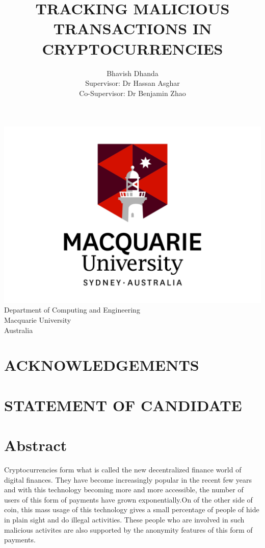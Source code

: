 \documentclass{article}
\begin{document}
\begin{titlepage}
\title{TRACKING MALICIOUS TRANSACTIONS IN CRYPTOCURRENCIES}
\author{Bhavish Dhanda {\\ Supervisor: Dr Hassan Asghar} {\\ Co-Supervisor: Dr Benjamin Zhao}}
\date{}
\end{titlepage}
\maketitle
\begin{center}
    \includegraphics[width=0.7\linewidth]{logo.jpg}\\[4ex]
    Department of Computing and Engineering\\
    Macquarie University\\
    Australia
\end{center}
\pagebreak

\begin{center}
    \section*{ACKNOWLEDGEMENTS}
        \pagebreak
    \section*{STATEMENT OF CANDIDATE}
        \pagebreak
\end{center}

\tableofcontents
\pagebreak
\listoffigures
\pagebreak
\lstlistoflistings
\pagebreak

\section{Abstract}
Cryptocurrencies form what is called the new decentralized finance world of digital finances. They have become increasingly popular in the recent few years and with this technology becoming more and more accessible, the number of users of this form of payments have grown exponentially.On of the other side of coin, this mass usage of this technology gives a small percentage of people of hide in plain sight and do illegal activities. These people who are involved in such malicious activites are also supported by the anonymity features of this form of payments. 
\pagebreak
\end{document}
